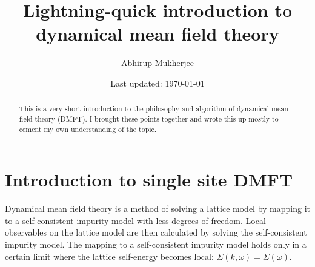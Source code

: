 \documentclass{article}
\begin{document}
\title{\bf Lightning-quick introduction to dynamical mean field theory}
\author{Abhirup Mukherjee}
\date{Last updated: \today}
\maketitle
\begin{abstract}
This is a very short introduction to the philosophy and algorithm of dynamical mean field theory (DMFT). I brought these points together and wrote this up mostly to cement my own understanding of the topic.
\end{abstract}

\section{Introduction to single site DMFT}
Dynamical mean field theory is a method of solving a lattice model by mapping it to a self-consistent impurity model with less degrees of freedom. Local observables on the lattice model are then calculated by solving the self-consistent impurity model. The mapping to a self-consistent impurity model holds only in a certain limit where the lattice self-energy becomes local: \(\Sigma(k,\omega) = \Sigma(\omega)\).
\end{document}
